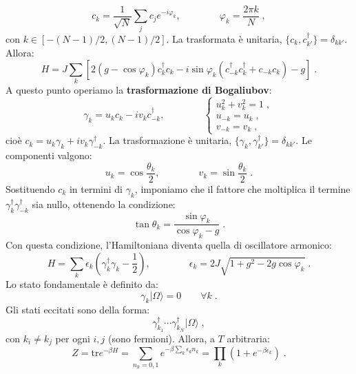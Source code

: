 \documentclass[10pt,a4paper]{report}
\theoremstyle{definition}
\numberwithin{equation}{section}
\newcommand{\ket}{\rangle}
\newcommand{\adj}[1]{#1^{\dagger}}
\newcommand{\tr}{\mathrm{tr}}
\begin{document}
\begin{equation}
c_k=\frac{1}{\sqrt{N}}\sum_jc_je^{-i\varphi_k},\qquad\qquad \varphi_k=\frac{2\pi k}{N}\;,
\end{equation}
con $k\in [-(N-1)/2,(N-1)/2]$. La trasformata è unitaria, $\{c_k,\adj{c}_{k'}\}=\delta_{kk'}$. Allora:
\begin{equation}
H=J\sum_k\left[2(g-\cos\varphi_k)\adj{c}_kc_k-i\sin\varphi_k\left(\adj{c}_{-k}\adj{c}_k+c_{-k}c_k\right)-g\right]\;.
\end{equation}
A questo punto operiamo la \textbf{trasformazione di Bogaliubov}:
\begin{equation}
\gamma_k=u_kc_k-iv_k\adj{c}_{-k},\qquad \qquad \begin{cases}
u_k^2+v_k^2=1\;, \\
u_{-k}=u_k\;, \\
v_{-k}=v_k\;,
\end{cases}
\end{equation}
cioè $c_k=u_k\gamma_k+iv_k\adj{\gamma}_{-k}$. La trasformazione è unitaria, $\{\gamma_k,\adj{\gamma}_{k'}\}=\delta_{kk'}$. Le componenti valgono:
\begin{equation}
u_k=\cos\frac{\theta_k}{2},\qquad\qquad v_k=\sin\frac{\theta_k}{2}\;.
\end{equation}
Sostituendo $c_k$ in termini di $\gamma_k$, imponiamo che il fattore che moltiplica il termine $\adj{\gamma}_k\adj{\gamma}_{-k}$ sia nullo, ottenendo la condizione:
\begin{equation}
\tan\theta_k=\frac{\sin\varphi_k}{\cos\varphi_k-g}\;.
\end{equation}
Con questa condizione, l'Hamiltoniana diventa quella di oscillatore armonico:
\begin{equation}
H=\sum_k\epsilon_k\left(\adj{\gamma}_k\gamma_k-\frac{1}{2}\right),\qquad\qquad \epsilon_k=2J\sqrt{1+g^2-2g\cos\varphi_k}\;.
\end{equation}
Lo stato fondamentale è definito da:
\begin{equation}
\gamma_k|\Omega\ket=0\qquad \forall k\;.
\end{equation}
Gli stati eccitati sono della forma:
\begin{equation}
\adj{\gamma}_{k_1}\cdots\adj{\gamma}_{k_N}|\Omega\ket\;,
\end{equation}
con $k_i\ne k_j$ per ogni $i,j$ (sono fermioni). Allora, a $T$ arbitraria:
\begin{equation}
Z=\tr e^{-\beta H}=\sum_{n_k=0,1}e^{-\beta\sum_k\epsilon_kn_k}=\prod_k(1+e^{-\beta\epsilon_k})\;.
\end{equation}
\end{document}

